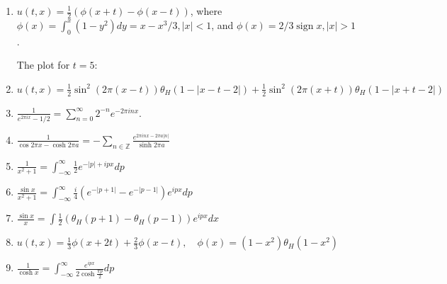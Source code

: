 \documentclass[a4paper,11pt]{article}
\begin{document}
\begin{enumerate}
\item\label{item:17} \(u(t,x)=\frac12(\phi(x+t)-\phi(x-t))\), where \(\phi(x)=\int_0^x (1-y^2)dy = x-x^3/3, |x|<1\), and \(\phi(x)=2/3 \operatorname{sign}x, |x|>1\).

The plot for \(t=5\):
\begin{center}
\end{center}

\item\label{item:24} \(u(t,x)=\frac12\sin^2(2\pi (x-t))\theta_H(1-|x-t-2|)+\frac12\sin^2(2\pi (x+t))\theta_H(1-|x+t-2|)\)

\item\label{item:26} \(\frac1{e^{2\pi ix}-1/2}=\sum_{n=0}^{\infty}2^{-n}e^{-2\pi i n x}\).

\item\label{item:27} \(\frac{1}{\cos 2\pi x - \cosh 2\pi a}=-\sum_{n\in \mathbb{Z}} \frac{e^{2\pi i n x - 2\pi a |n|}}{\sinh 2 \pi a}\)

\item\label{item:28} \(\frac1{x^2+1}=\int_{-\infty}^{\infty}\frac12 e^{-|p|+i p x}dp\)

\item\label{item:29} \(\frac{\sin x}{x^2+1}=\int_{-\infty}^{\infty} \frac{i}{4}\left(e^{-|p+1|}-e^{-|p-1|} \right)e^{i p x} dp\)

\item\label{item:30} \(\frac{\sin x}{x}=\int \frac12 \left( \theta_H(p+1)-\theta_H(p-1) \right) e^{i p x}dx\)

\item\label{item:31} \(u(t,x)=\frac1{3}\phi(x+2t)+\frac{2}{3}\phi(x-t),\quad \phi(x)=(1-x^2)\theta_H(1-x^2)\)

\item\label{item:32} \(\frac1{\cosh x}=\int_{-\infty}^{\infty} \frac{e^{i p x}}{2\cosh \frac{\pi p}{2}} dp\)


\end{enumerate}
\end{document}
